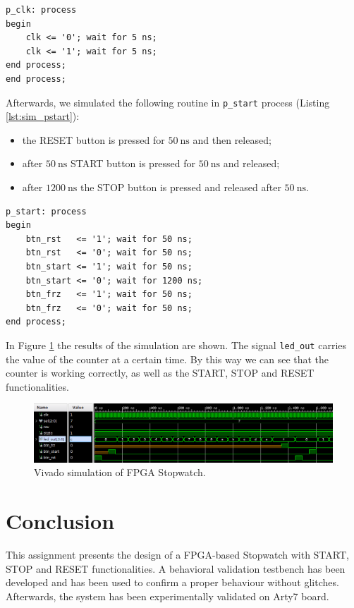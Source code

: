 \documentclass[11pt, a4paper]{article}
\begin{document}
\begin{lstlisting}[style=vhdl,label={lst:sim_clk},caption={{\footnotesize\texttt{speed}} and {\footnotesize\texttt{p\_clk}} process.}]
p_clk: process
begin
    clk <= '0'; wait for 5 ns;
    clk <= '1'; wait for 5 ns;
end process;
end process;\end{lstlisting}


Afterwards, we simulated the following routine in {\footnotesize\texttt{p\_start}} process (Listing \ref{lst:sim_pstart}):
\begin{itemize}
    \item the RESET button is pressed for $\SI{50}{\ns}$ and then released;
    \item after $\SI{50}{\ns}$ START button is pressed for $\SI{50}{\ns}$ and released;
    \item after $\SI{1200}{\ns}$ the STOP button is pressed and released after $\SI{50}{\ns}$.
\end{itemize}


\begin{lstlisting}[style=vhdl,label={lst:sim_pstart},caption={{\footnotesize\texttt{p\_start}} process.}]
p_start: process
begin
    btn_rst   <= '1'; wait for 50 ns;
    btn_rst   <= '0'; wait for 50 ns;
    btn_start <= '1'; wait for 50 ns;
    btn_start <= '0'; wait for 1200 ns;
    btn_frz   <= '1'; wait for 50 ns;
    btn_frz   <= '0'; wait for 50 ns;
end process;\end{lstlisting}

In Figure \ref{fig:sim_1} the results of the simulation are shown. The signal {\footnotesize\texttt{led\_out}} carries the value of the counter at a certain time. By this way we can see that the counter is working correctly, as well as the START, STOP and RESET functionalities.


\begin{figure}[H]
\centering
\includegraphics[width=1\textwidth]{../main/image/sim_2.png}
\caption{\label{fig:sim_1} Vivado simulation of FPGA Stopwatch.}
\end{figure}





\section{Conclusion}
This assignment presents the design of a FPGA-based Stopwatch with START, STOP and RESET functionalities.
A behavioral validation testbench has been developed and has been used to confirm a proper behaviour without glitches.
Afterwards, the system has been experimentally validated on Arty7 board.
\end{document}
